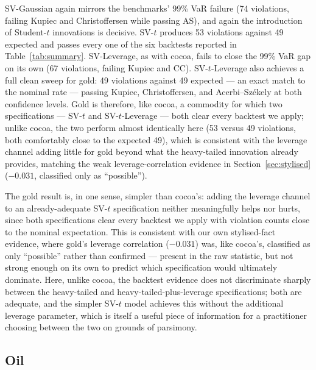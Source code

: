 \documentclass[preprint,12pt,authoryear]{elsarticle}
\begin{document}
SV-Gaussian again mirrors the benchmarks' 99\% VaR failure (74 violations, failing Kupiec and Christoffersen while passing AS), and again the introduction of Student-$t$ innovations is decisive. SV-$t$ produces 53 violations against 49 expected and passes every one of the six backtests reported in Table~\ref{tab:summary}. SV-Leverage, as with cocoa, fails to close the 99\% VaR gap on its own (67 violations, failing Kupiec and CC). SV-$t$-Leverage also achieves a full clean sweep for gold: 49 violations against 49 expected --- an exact match to the nominal rate --- passing Kupiec, Christoffersen, and Acerbi--Sz\'ekely at both confidence levels. Gold is therefore, like cocoa, a commodity for which two specifications --- SV-$t$ and SV-$t$-Leverage --- both clear every backtest we apply; unlike cocoa, the two perform almost identically here (53 versus 49 violations, both comfortably close to the expected 49), which is consistent with the leverage channel adding little for gold beyond what the heavy-tailed innovation already provides, matching the weak leverage-correlation evidence in Section~\ref{sec:stylised} ($-0.031$, classified only as ``possible'').

The gold result is, in one sense, simpler than cocoa's: adding the leverage channel to an already-adequate SV-$t$ specification neither meaningfully helps nor hurts, since both specifications clear every backtest we apply with violation counts close to the nominal expectation. This is consistent with our own stylised-fact evidence, where gold's leverage correlation ($-0.031$) was, like cocoa's, classified as only ``possible'' rather than confirmed --- present in the raw statistic, but not strong enough on its own to predict which specification would ultimately dominate. Here, unlike cocoa, the backtest evidence does not discriminate sharply between the heavy-tailed and heavy-tailed-plus-leverage specifications; both are adequate, and the simpler SV-$t$ model achieves this without the additional leverage parameter, which is itself a useful piece of information for a practitioner choosing between the two on grounds of parsimony.

\subsection{Oil}
\label{sec:results_oil}
\end{document}
